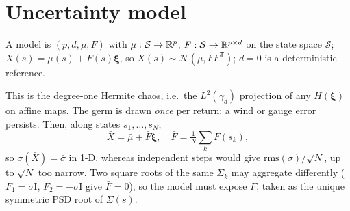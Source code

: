 \documentclass[10pt,twocolumn]{article}
\newcommand{\Germ}{\bm\xi}
\newcommand{\Norm}{\mathcal N}
\newcommand{\T}{^{\mathsf T}}
\newcommand{\Id}{\mathrm I}
\begin{document}
\section{Uncertainty model}
\begin{definition}
A model is $(p,d,\mu,F)$ with $\mu:\mathcal S\to\mathbb{R}^p$, $F:\mathcal S\to\mathbb{R}^{p\times d}$ on the state space $\mathcal S$; $X(s)=\mu(s)+F(s)\Germ$, so $X(s)\sim\Norm(\mu,FF\T)$; $d=0$ is a deterministic reference.
\end{definition}
This is the degree-one Hermite chaos, i.e.\ the $L^2(\gamma_d)$ projection of any $H(\Germ)$ on affine maps. The germ is drawn \emph{once} per return: a wind or gauge error persists. Then, along states $s_1,\dots,s_N$,
\begin{equation}
\bar X=\bar\mu+\bar F\Germ,\quad \bar F=\tfrac1N\textstyle\sum_kF(s_k),
\end{equation}
so $\sigma(\bar X)=\bar\sigma$ in 1-D, whereas independent steps would give $\mathrm{rms}(\sigma)/\sqrt N$, up to $\sqrt N$ too narrow. Two square roots of the same $\Sigma_k$ may aggregate differently ($F_1=\sigma\Id$, $F_2=-\sigma\Id$ give $\bar F=0$), so the model must expose $F$, taken as the unique symmetric PSD root of $\Sigma(s)$.
\end{document}
